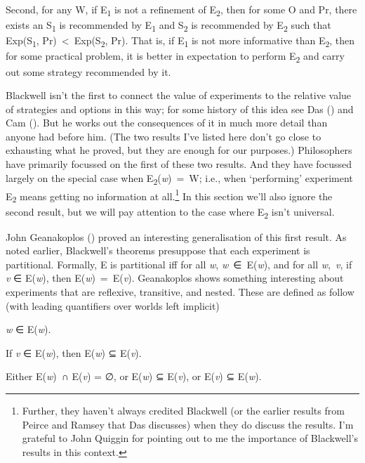 \documentclass[
  12pt,
  letterpaper,
  DIV=11,
  numbers=noendperiod]{scrartcl}
\providecommand{\tightlist}{%
  \setlength{\itemsep}{0pt}\setlength{\parskip}{0pt}}\usepackage{longtable,booktabs,array}
\begin{document}
Second, for any W, if E\textsubscript{1} is not a refinement of
E\textsubscript{2}, then for some O and Pr, there exists an
S\textsubscript{1} is recommended by E\textsubscript{1} and
S\textsubscript{2} is recommended by E\textsubscript{2} such that
Exp(S\textsubscript{1}, Pr)~\textless~Exp(S\textsubscript{2}, Pr). That
is, if E\textsubscript{1} is not more informative than
E\textsubscript{2}, then for some practical problem, it is better in
expectation to perform E\textsubscript{2} and carry out some strategy
recommended by it.

Blackwell isn't the first to connect the value of experiments to the
relative value of strategies and options in this way; for some history
of this idea see Das () and Cam
(). But he works out the consequences of
it in much more detail than anyone had before him. (The two results I've
listed here don't go close to exhausting what he proved, but they are
enough for our purposes.) Philosophers have primarily focussed on the
first of these two results. And they have focussed largely on the
special case when E\textsubscript{2}(\emph{w})~=~W; i.e., when
`performing' experiment E\textsubscript{2} means getting no information
at all.\footnote{Further, they haven't always credited Blackwell (or the
  earlier results from Peirce and Ramsey that Das discusses) when they
  do discuss the results. I'm grateful to John Quiggin for pointing out
  to me the importance of Blackwell's results in this context.} In this
section we'll also ignore the second result, but we will pay attention
to the case where E\textsubscript{2} isn't universal.

John Geanakoplos ()
proved an interesting generalisation of this first result. As noted
earlier, Blackwell's theorems presuppose that each experiment is
partitional. Formally, E is partitional iff for all \emph{w},
\emph{w}~∈~E(\emph{w}), and for all \emph{w},~\emph{v}, if \emph{v} ∈
E(\emph{w}), then E(\emph{w})~=~E(\emph{v}). Geanakoplos shows something
interesting about experiments that are reflexive, transitive, and
nested. These are defined as follow (with leading quantifiers over
worlds left implicit)

\begin{description}
\tightlist
\item[Reflexive]
\emph{w} ∈ E(\emph{w}).
\item[Transitive]
If \emph{v} ∈ E(\emph{w}), then E(\emph{w}) ⊆ E(\emph{v}).
\item[Nested]
Either E(\emph{w})~∩ E(\emph{v}) = ∅, or E(\emph{w}) ⊆ E(\emph{v}), or
E(\emph{v}) ⊆ E(\emph{w}).
\end{description}
\end{document}

